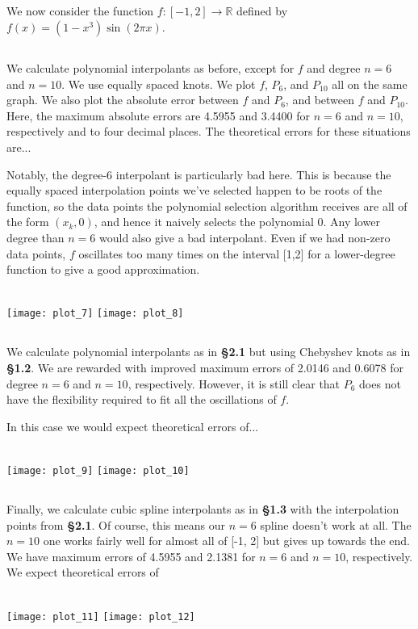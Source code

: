 \documentclass[11pt, oneside]{article}
\begin{document}
We now consider the function $f: [-1, 2] \rightarrow \mathbb{R}$ defined by
$f(x) = (1 - x^3)\sin(2 \pi x)$.

\subsection{}

We calculate polynomial interpolants as before, except for $f$ and degree $n = 6$ and $n = 10$. We use equally spaced knots. We plot $f$, $P_6$, and $P_{10}$ all on the same graph. We also plot the absolute error between $f$ and $P_6$, and between $f$ and $P_10$. Here, the maximum absolute errors are 4.5955 and 3.4400 for $n = 6$ and $n = 10$, respectively and to four decimal places. The theoretical errors for these situations are... 

Notably, the degree-6 interpolant is particularly bad here. This is because the equally spaced interpolation points we've selected happen to be roots of the function, so the data points the polynomial selection algorithm receives are all of the form $(x_k, 0)$, and hence it naively selects the polynomial $0$. Any lower degree than $n = 6$ would also give a bad interpolant. Even if we had non-zero data points, $f$ oscillates too many times on the interval [1,2] for a lower-degree function to give a good approximation. 

~\\

\texttt{[image: plot\_7]}
\texttt{[image: plot\_8]}

\subsection{}

We calculate polynomial interpolants as in \textbf{\S2.1} but using Chebyshev knots as in \textbf{\S1.2}. We are rewarded with improved maximum errors of 2.0146 and 0.6078 for degree $n = 6$ and $n = 10$, respectively. However, it is still clear that $P_6$ does not have the flexibility required to fit all the oscillations of $f$. 

In this case we would expect theoretical errors of...

~\\

\texttt{[image: plot\_9]}
\texttt{[image: plot\_10]}

\subsection{}

Finally, we calculate cubic spline interpolants as in \textbf{\S1.3} with the interpolation points from \textbf{\S2.1}. Of course, this means our $n = 6$ spline doesn't work at all. The $n = 10$ one works fairly well for almost all of [-1, 2] but gives up towards the end. We have maximum errors of 4.5955 and 2.1381 for $n = 6$ and $n = 10$, respectively. We expect theoretical errors of 

~\\

\texttt{[image: plot\_11]}
\texttt{[image: plot\_12]}
\end{document}

